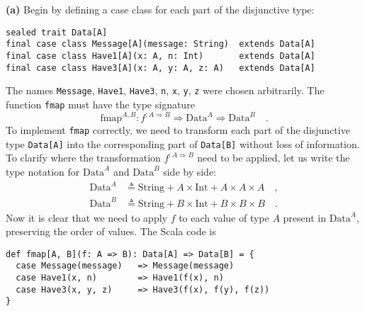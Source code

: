 \textbf{(a)} Begin by defining a case class for each part of the disjunctive
type:
\begin{lstlisting}
sealed trait Data[A] 
final case class Message[A](message: String)  extends Data[A]
final case class Have1[A](x: A, n: Int)       extends Data[A]  
final case class Have3[A](x: A, y: A, z: A)   extends Data[A]
\end{lstlisting}
The names \lstinline!Message!, \lstinline!Have1!, \lstinline!Have3!,
\lstinline!n!, \lstinline!x!, \lstinline!y!, \lstinline!z! were
chosen arbitrarily. The function \lstinline!fmap! must have the type
signature
\[
\text{fmap}^{A,B}:f^{:A\Rightarrow B}\Rightarrow\text{Data}^{A}\Rightarrow\text{Data}^{B}\quad.
\]
To implement \lstinline!fmap! correctly, we need to transform each
part of the disjunctive type \lstinline!Data[A]! into the corresponding
part of \lstinline!Data[B]! without loss of information. To clarify
where the transformation $f^{:A\Rightarrow B}$ need to be applied,
let us write the type notation for $\text{Data}^{A}$ and $\text{Data}^{B}$
side by side:
\begin{align*}
\text{Data}^{A} & \triangleq\text{String}+A\times\text{Int}+A\times A\times A\quad,\\
\text{Data}^{B} & \triangleq\text{String}+B\times\text{Int}+B\times B\times B\quad.
\end{align*}
Now it is clear that we need to apply $f$ to each value of type $A$
present in $\text{Data}^{A}$, preserving the order of values. The
Scala code is
\begin{lstlisting}
def fmap[A, B](f: A => B): Data[A] => Data[B] = {
  case Message(message)   => Message(message)
  case Have1(x, n)        => Have1(f(x), n)
  case Have3(x, y, z)     => Have3(f(x), f(y), f(z))
}
\end{lstlisting}

